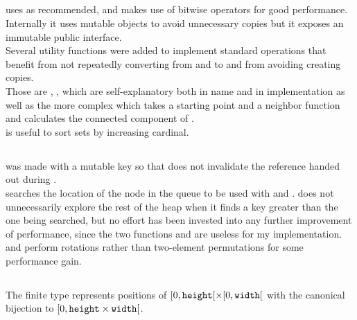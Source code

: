 \subsection{}

 uses  as recommended, and makes use of
bitwise operators for good performance.\\

Internally it uses mutable objects to avoid unnecessary copies but it exposes
an immutable public interface.\\

Several utility functions were added to implement standard operations that benefit
from not repeatedly converting from and to  and from avoiding creating
copies.\\
Those are , ,  which are self-explanatory
both in name and in implementation as well as the more complex
 which takes a starting point and a 
neighbor function and calculates the connected component of .\\
 is useful to sort sets by increasing cardinal.


\subsection{}

 was made with a mutable key so that  does
not invalidate the reference handed out during .\\
 searches the location of the node in the queue to be used with
 and .  does not unnecessarily explore
the rest of the heap when it finds a key greater than the one being searched,
but no effort has been invested into any further improvement of performance,
since the two functions  and  are useless for
my implementation.\\

 and  perform rotations rather than two-element permutations
for some performance gain.\\


\subsection{}

The finite type represents positions of \([0,\texttt{height}[ \times [0,\texttt{width}[\)
with the canonical bijection to \([0, \texttt{height}\times\texttt{width}[\).\\

